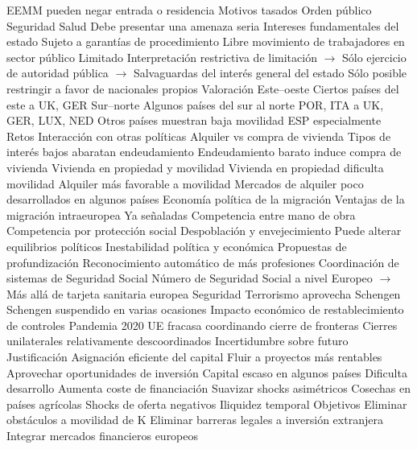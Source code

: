 \documentclass{nuevotema}
\begin{document}
\begin{esquemal}
				\4 EEMM pueden negar entrada o residencia
				\4 Motivos tasados
				\4[] Orden público
				\4[] Seguridad
				\4[] Salud
				\4 Debe presentar una amenaza seria
				\4[] Intereses fundamentales del estado
				\4 Sujeto a garantías de procedimiento
				\4 Libre movimiento de trabajadores en sector público
				\4[] Limitado
				\4[] Interpretación restrictiva de limitación
				\4[] $\to$ Sólo ejercicio de autoridad pública
				\4[] $\to$ Salvaguardas del interés general del estado
				\4[] Sólo posible restringir a favor de nacionales propios
		\2 Valoración
			\3 Este--oeste
				\4 Ciertos países del este a UK, GER
			\3 Sur--norte
				\4 Algunos países del sur al norte
				\4[] POR, ITA a UK, GER, LUX, NED
				\4 Otros países muestran baja movilidad
				\4[] ESP especialmente
		\2 Retos
			\3 Interacción con otras políticas
				\4 Alquiler vs compra de vivienda
				\4[] Tipos de interés bajos abaratan endeudamiento
				\4[] Endeudamiento barato induce compra de vivienda
				\4 Vivienda en propiedad y movilidad
				\4[] Vivienda en propiedad dificulta movilidad
				\4[] Alquiler más favorable a movilidad
				\4[] Mercados de alquiler poco desarrollados en algunos países
			\3 Economía política de la migración
				\4 Ventajas de la migración intraeuropea
				\4[] Ya señaladas
				\4 Competencia entre mano de obra
				\4 Competencia por protección social
				\4 Despoblación y envejecimiento
				\4[$\then$] Puede alterar equilibrios políticos
				\4[] Inestabilidad política y económica
			\3 Propuestas de profundización
				\4 Reconocimiento automático de más profesiones
				\4 Coordinación de sistemas de Seguridad Social
				\4 Número de Seguridad Social a nivel Europeo
				\4[] $\to$ Más allá de tarjeta sanitaria europea
			\3 Seguridad
				\4 Terrorismo aprovecha Schengen
				\4 Schengen suspendido en varias ocasiones
				\4 Impacto económico de restablecimiento de controles
			\3 Pandemia 2020
				\4 UE fracasa coordinando cierre de fronteras
				\4 Cierres unilaterales relativamente descoordinados
				\4 Incertidumbre sobre futuro
	\1 
		\2 Justificación
			\3 Asignación eficiente del capital
				\4 Fluir a proyectos más rentables
				\4 Aprovechar oportunidades de inversión
			\3 Capital escaso en algunos países
				\4 Dificulta desarrollo
				\4 Aumenta coste de financiación
			\3 Suavizar shocks asimétricos
				\4 Cosechas en países agrícolas
				\4 Shocks de oferta negativos
				\4 Iliquidez temporal
		\2 Objetivos
			\3 Eliminar obstáculos a movilidad de K
				\4 Eliminar barreras legales a inversión extranjera
			\3 Integrar mercados financieros europeos

\end{esquemal}
\end{document}

